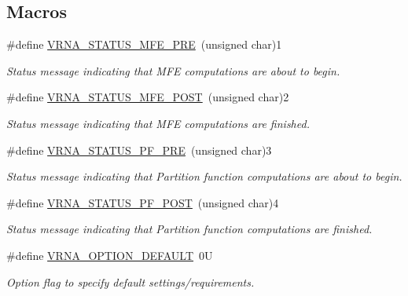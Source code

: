 \subsection*{Macros}
\begin{DoxyCompactItemize}
\item 
\#define \hyperlink{group__fold__compound_ga1a5053dc8acbb0111e852988726f07d6}{V\+R\+N\+A\+\_\+\+S\+T\+A\+T\+U\+S\+\_\+\+M\+F\+E\+\_\+\+P\+RE}~(unsigned char)1
\begin{DoxyCompactList}\small\item\em Status message indicating that M\+FE computations are about to begin. \end{DoxyCompactList}\item 
\#define \hyperlink{group__fold__compound_ga47c900ca76e56e59e2e83a06e0bde641}{V\+R\+N\+A\+\_\+\+S\+T\+A\+T\+U\+S\+\_\+\+M\+F\+E\+\_\+\+P\+O\+ST}~(unsigned char)2
\begin{DoxyCompactList}\small\item\em Status message indicating that M\+FE computations are finished. \end{DoxyCompactList}\item 
\#define \hyperlink{group__fold__compound_ga91795d35ebdb6f32be50459f24b3d114}{V\+R\+N\+A\+\_\+\+S\+T\+A\+T\+U\+S\+\_\+\+P\+F\+\_\+\+P\+RE}~(unsigned char)3
\begin{DoxyCompactList}\small\item\em Status message indicating that Partition function computations are about to begin. \end{DoxyCompactList}\item 
\#define \hyperlink{group__fold__compound_ga1c6fa243533fd026e50f7d595eaaa565}{V\+R\+N\+A\+\_\+\+S\+T\+A\+T\+U\+S\+\_\+\+P\+F\+\_\+\+P\+O\+ST}~(unsigned char)4
\begin{DoxyCompactList}\small\item\em Status message indicating that Partition function computations are finished. \end{DoxyCompactList}\item 
\mbox{\label{group__fold__compound_gacea5b7ee6181c485f36e2afa0e9089e4}} 
\#define \hyperlink{group__fold__compound_gacea5b7ee6181c485f36e2afa0e9089e4}{V\+R\+N\+A\+\_\+\+O\+P\+T\+I\+O\+N\+\_\+\+D\+E\+F\+A\+U\+LT}~0U
\begin{DoxyCompactList}\small\item\em Option flag to specify default settings/requirements. \end{DoxyCompactList}\item 

\end{DoxyCompactItemize}
